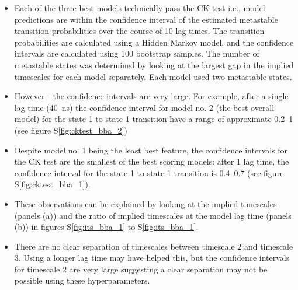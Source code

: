 \documentclass[journal=jacsat,manuscript=article]{achemso}
\newcommand*\sref[1]{%
    S\ref{#1}}
\begin{document}
\begin{itemize}


    \item Each of the three best models technically pass the CK test i.e., model predictions are within the confidence interval of the estimated metastable transition probabilities over the course of 10 lag times. The transition probabilities are calculated using a Hidden Markov model, and the confidence intervals are calculated using 100 bootstrap samples. The number of metastable states was determined by looking at the largest gap in the implied timescales for each model separately. Each model used two metastable states. 
    \item However - the confidence intervals are very large.  For example, after a single lag time (\SI{40}{\nano\second}) the confidence interval for model no. 2 (the best overall model) for the state 1 to state 1 transition have a range of approximate \numrange{0.2}{1} (see figure \sref{fig:cktest_bba_2})
    \item Despite model no. 1  being the least best feature, the confidence intervals for the CK test are the smallest of the best scoring models: after 1 lag time, the confidence interval for the state 1 to state 1 transition is \numrange[range-phrase = --]{0.4}{0.7}  (see figure \sref{fig:cktest_bba_1}).  
    \item These observations can be explained by looking at the implied timescales (panels (a)) and the ratio of implied timescales at the model lag time (panels (b)) in figures \sref{fig:its_bba_1} to \sref{fig:its_bba_1}. 
    \item There are no clear separation of timescales between timescale 2 and timescale 3.  Using a longer lag time may have helped this, but the confidence intervals for timescale 2 are very large suggesting a clear separation may not be possible using these hyperparameters. 
\end{itemize}

\end{document}
